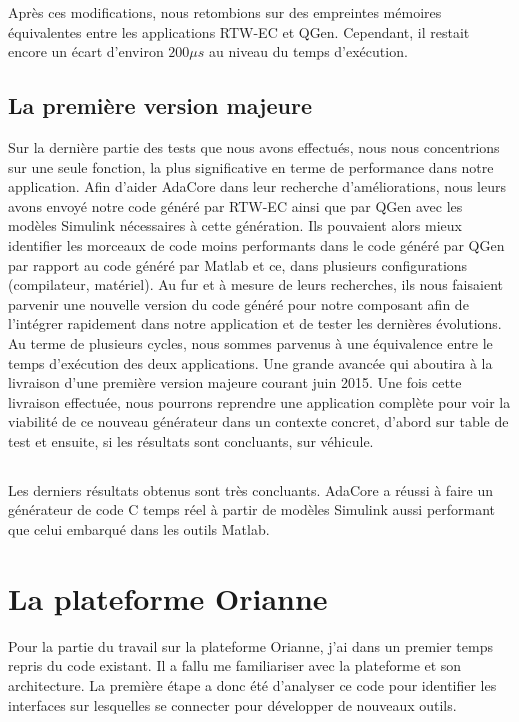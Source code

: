 Après ces modifications, nous retombions sur des empreintes mémoires
équivalentes entre les applications RTW-EC\up{\circledR} et QGen.  Cependant, il
restait encore un écart d'environ $200\mu{}s$ au niveau du temps d'exécution.

\subsection{La première version majeure}
Sur la dernière partie des tests que nous avons effectués, nous nous concentrions
sur une seule fonction, la plus significative en terme de performance dans notre
application. Afin d'aider AdaCore dans leur recherche d'améliorations, nous
leurs avons envoyé notre code généré par RTW-EC\up{\circledR} ainsi que par QGen avec
les modèles Simulink\up{\circledR} nécessaires à cette génération. Ils pouvaient
alors mieux identifier les morceaux de code moins performants dans le code
généré par QGen par rapport au code généré par Matlab et ce, dans plusieurs
configurations (compilateur, matériel).
Au fur et à mesure de leurs recherches, ils nous faisaient parvenir une nouvelle
version du code généré pour notre composant afin de l'intégrer rapidement dans
notre application et de tester les dernières évolutions. Au terme de plusieurs
cycles, nous sommes parvenus à une équivalence entre le temps d'exécution des
deux applications. Une grande avancée qui aboutira à la livraison d'une première
version majeure courant juin 2015. Une fois cette livraison effectuée, nous
pourrons reprendre une application complète pour voir la viabilité de ce nouveau
générateur dans un contexte concret, d'abord sur table de test et ensuite, si
les résultats sont concluants, sur véhicule.

\subsection*{}
Les derniers résultats obtenus sont très concluants. AdaCore a réussi à
faire un générateur de code C temps réel à partir de modèles Simulink\up{\circledR} aussi
performant que celui embarqué dans les outils Matlab\up{\circledR}.

\section{La plateforme Orianne}
Pour la partie du travail sur la plateforme Orianne, j'ai dans un premier temps
repris du code existant. Il a fallu me familiariser avec la plateforme et son
architecture. La première étape a donc été d'analyser ce code pour identifier
les interfaces sur lesquelles se connecter pour développer de nouveaux outils.

